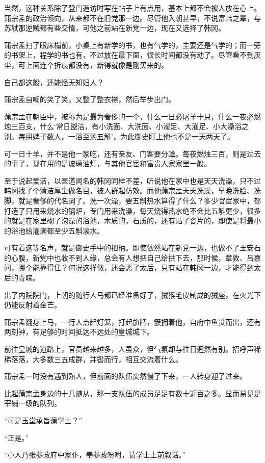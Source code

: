 当然，这种关系除了登门造访时写在帖子上有点用，基本上都不会被人放在心上。蒲宗孟的政治倾向，从来都不在旧党那一边。尽管他入朝甚早，不说富韩之辈，与苏轼那逆贼都有些交情，可他之前站在新党一边，现在又选择了韩冈。

蒲宗孟扫了眼床榻前，小桌上有新学的书，也有气学的，主要还是气学的；而一旁的书架上，程学的书也有，不过放在最下面，很长时间都没有动了。尽管看不到灰尘，可上面连个折痕都没有，新得就像是刚买来的。

自己都这般，还能怪无知妇人？

蒲宗孟自嘲的笑了笑，又整了整衣襟，然后举步出门。

蒲宗孟在朝臣中，被称为是最为奢侈的一个，什么一日必屠羊十只，什么一夜必燃烛三百支，什么‘常日盥洁，有小洗面、大洗面、小濯足、大濯足、小大澡浴之别。每用婢子数人，一浴至汤五斛’，为此御史盯上他也不是一天两天了。

可一日十羊，并不是他一家吃，还有亲友、门客要分赡。每夜燃烛三百，则是过去的事了，现在用的是玻璃油灯，与其他官宦和富贵人家家里一般。

至于说起爱洁，以医道闻名的韩冈同样不差，听说他在家中也是天天洗澡，只不过韩冈找了个清洁厚生做名目，被人群起仿效。而他蒲宗孟天天洗澡，早晚洗脸、洗脚，就是奢侈的代名词了。洗一次澡，要五斛热水算得了什么？多少官宦家中，都打造了只用来烧水的锅炉，专门用来洗澡，每天烧得热水绝不会比五斛更少，很多的就是在家里砌了泡澡的浴池，木质的，石质的，还有贴了瓷片的，即使是将最小的浴池给灌满都至少五斛滚水。

可有着这等名声，就是御史手中的把柄。即使依然站在新党一边，也做不了王安石的心腹，新党中也收不到人缘，总会有人想把自己给拱下去，那时候，章敦、吕嘉问，哪个能靠得住？何况这样做，还会恶了太后，只有站在韩冈一边，才能得到太后的青睐。

出了内院院门，上朝的随行人马都已经准备好了，狨猴毛皮制成的狨座，在火光下仍能反射着金芒。

蒲宗孟翻身上马，一行人点起灯笼，打起旗牌，簇拥着他，自府中鱼贯而出，还有两刻钟，有足够的时间抵达不远处的皇城城下。

前往皇城的道路上，官员越来越多，人虽众，但气氛却与往日迥然有别。招呼声稀稀落落，大多数三五成群，并辔而行，相互交流着什么。

蒲宗孟一时没有遇到熟人，但前面的队伍突然慢了下来，一人转身迎了过来。

比起蒲宗孟身边的十几随从，那一支队伍的成员足足有数十近百之多。显而易见是宰辅一级的队列。

“可是玉堂承旨蒲学士？”

“正是。”

“小人乃张参政府中家仆，奉参政吩咐，请学士上前叙话。”

